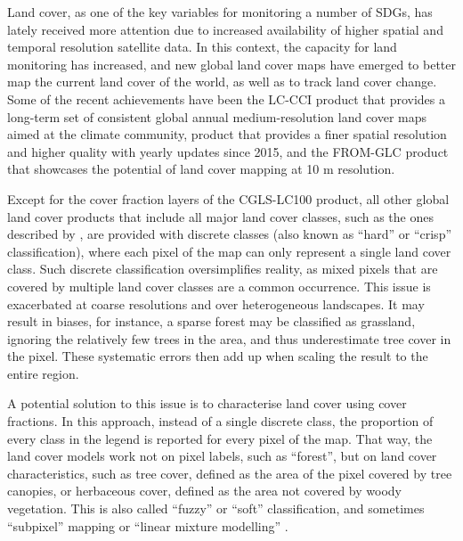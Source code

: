 \documentclass[review,authoryear,3p]{elsarticle}
\begin{document}
Land cover, as one of the key variables for monitoring a number of \glspl{SDG}, has lately received more attention due to increased availability of higher spatial and temporal resolution satellite data.
In this context, the capacity for land monitoring has increased, and new global land cover maps have emerged to better map the current land cover of the world, as well as to track land cover change.
Some of the recent achievements have been the \ac{LC-CCI} product \citep{esa_land_2017} that provides a long-term set of consistent global annual medium-resolution land cover maps aimed at the climate community,  product \citep{buchhorn_moderate_2019, buchhorn_copernicus_2020} that provides a finer spatial resolution and higher quality with yearly updates since 2015, and the \ac{FROM-GLC} product \citep{fromglc2019} that showcases the potential of land cover mapping at 10 m resolution.

Except for the cover fraction layers of the \ac{CGLS-LC100} product, all other global land cover products that include all major land cover classes, such as the ones described by \citet{bartholome2005glc2000, friedl2010modis, arino2007globcover, see2015hybrid, chen2015globeland30}, are provided with discrete classes (also known as ``hard'' or ``crisp'' classification), where each pixel of the map can only represent a single land cover class.
Such discrete classification oversimplifies reality, as mixed pixels that are covered by multiple land cover classes are a common occurrence. 
This issue is exacerbated at coarse resolutions and over heterogeneous landscapes.
It may result in biases, for instance, a sparse forest may be classified as grassland, ignoring the relatively few trees in the area, and thus underestimate tree cover in the pixel.
These systematic errors then add up when scaling the result to the entire region.

A potential solution to this issue is to characterise land cover using cover fractions.
In this approach, instead of a single discrete class, the proportion of every class in the legend is reported for every pixel of the map.
That way, the land cover models work not on pixel labels, such as ``forest'', but on land cover characteristics, such as tree cover, defined as the area of the pixel covered by tree canopies, or herbaceous cover, defined as the area not covered by woody vegetation.
This is also called ``fuzzy'' or ``soft'' classification, and sometimes ``subpixel'' mapping or ``linear mixture modelling'' \citep{Okeke2006fuzzyexponent}.
\end{document}
